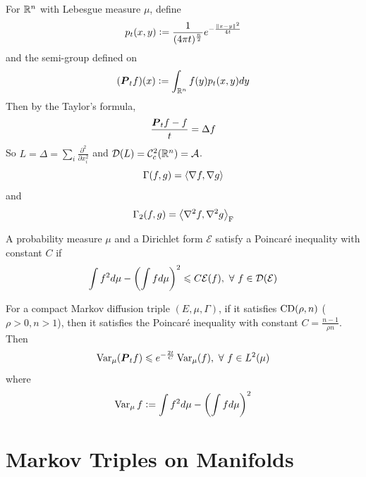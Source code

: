 \documentclass[a4paper,12pt]{article}
\begin{document}
\begin{itemize}
  \begin{exam}
    For $\mathbb{R}^n$ with Lebesgue measure $\mu$, define
    \begin{equation*}
      p_t(x,y) \vcentcolon= \frac{1}{(4\pi t)^{\frac{n}{2}}}e^{-\frac{\left\lVert x-y\right\lVert^2}{4t}}
    \end{equation*}
    and the semi-group defined on
    \begin{equation*}
      (\boldsymbol{P}_tf)(x) \vcentcolon= \int_{\mathbb{R}^n} f(y)p_t(x,y)dy
    \end{equation*}
    Then by the Taylor's formula,
    \begin{equation*}
      \frac{\boldsymbol{P}_tf - f}{t} = \Delta f
    \end{equation*}
    So $L = \Delta = \sum_i\frac{\partial^2}{\partial x_i^2}$ and $\mathcal{D}(L) = \mathcal{C}_c^2(\mathbb{R}^n) = \mathcal{A}$. 
    \begin{equation*}
      \Gamma(f,g) = \left\langle \nabla f, \nabla g \right\rangle
    \end{equation*}
    and
    \begin{equation*}
      \Gamma_2(f,g) = \left\langle \nabla^2 f, \nabla^2 g \right\rangle_{\operatorname{F}}
    \end{equation*}
  \end{exam}

  \noindent A probability measure $\mu$ and a Dirichlet form $\mathcal{E}$ satisfy a Poincar\'e inequality with constant $C$ if
  \begin{equation*}
    \int f^2d \mu - \left(\int f d\mu\right)^2 \leqslant C\mathcal{E}(f),~\forall~f\in \mathcal{D}(\mathcal{E})
  \end{equation*}

  For a compact Markov diffusion triple $(E,\mu,\Gamma)$, if it satisfies $\operatorname{CD}(\rho,n)$ ($\rho > 0, n > 1$), then it satisfies the Poincar\'e inequality with constant $C = \frac{n-1}{\rho n}$. Then
  \begin{equation*}
    \operatorname{Var}_\mu(\boldsymbol{P}_tf) \leqslant e^{-\frac{2t}{C}}\operatorname{Var}_\mu(f),~\forall~f \in L^2(\mu)
  \end{equation*}
  where
  \begin{equation*}
    \operatorname{Var}_\mu f \vcentcolon= \int f^2d \mu - \left(\int f d\mu\right)^2
  \end{equation*}

\end{itemize}


\section{Markov Triples on Manifolds}
\end{document}

